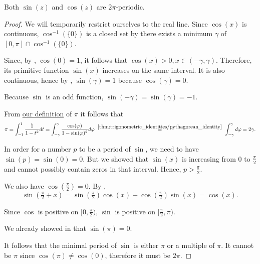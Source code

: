 \begin{theorem}\label{thm:trigonometric_function_period}
  Both \( \sin(z) \) and \( \cos(z) \) are \( 2\pi \)-periodic.
\end{theorem}
\begin{proof}
  We will temporarily restrict ourselves to the real line. Since \( \cos(x) \) is continuous, \( \cos^{-1}(\{ 0 \}) \) is a closed set by  there exists a minimum \( \gamma \) of \( [0, \pi] \cap \cos^{-1}(\{ 0 \}) \).

  Since, by , \( \cos(0) = 1 \), it follows that \( \cos(x) > 0, x \in (-\gamma, \gamma) \). Therefore, its primitive function \( \sin(x) \) increases on the same interval. It is also continuous, hence by , \( \sin(\gamma) = 1 \) because \( \cos(\gamma) = 0 \).

  Because \( \sin \) is an odd function, \( \sin(-\gamma) = \sin(\gamma) = -1 \).

  From \hyperref[def:pi]{our definition} of \( \pi \) it follows that
  \begin{equation*}
    \pi
    =
    \int_{-1}^1 \frac 1 {1 - t^2} dt
    =
    \int_{-\gamma}^\gamma \frac {\cos(\varphi)} {1 - \sin(\varphi)^2} d\varphi
    \reloset {\ref{thm:trigonometric_identities/pythagorean_identity}} =
    \int_{-\gamma}^\gamma d\varphi
    =
    2\gamma.
  \end{equation*}

  In order for a number \( p \) to be a period of \( \sin \), we need to have \( \sin(p) = \sin(0) = 0 \). But we showed that \( \sin(x) \) is increasing from \( 0 \) to \( \tfrac \pi 2 \) and cannot possibly contain zeros in that interval. Hence, \( p > \tfrac \pi 2 \).

  We also have \( \cos(\tfrac \pi 2) = 0 \). By ,
  \begin{equation*}
    \sin(\tfrac \pi 2 + x)
    =
    \sin(\tfrac \pi 2) \cos(x) + \cos(\tfrac \pi 2) \sin(x)
    =
    \cos(x).
  \end{equation*}

  Since \( \cos \) is positive on \( [0, \tfrac \pi 2) \), \( \sin \) is positive on \( [\tfrac \pi 2, \pi) \).

  We already showed in  that \( \sin(\pi) = 0 \).

  It follows that the minimal period of \( \sin \) is either \( \pi \) or a multiple of \( \pi \). It cannot be \( \pi \) since \( \cos(\pi) \neq \cos(0) \), therefore it must be \( 2\pi \).
\end{proof}

